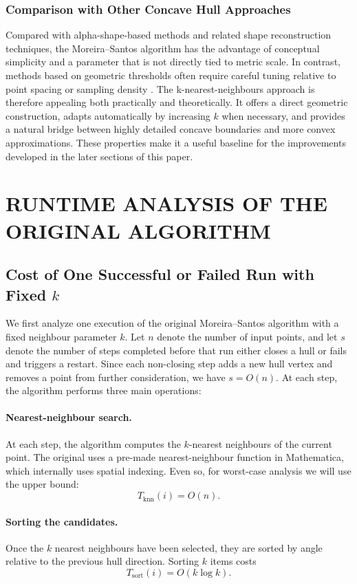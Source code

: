 \documentclass[a4paper,twoside]{article}
\begin{document}
\subsubsection{Comparison with Other Concave Hull Approaches}
Compared with alpha-shape-based methods and related shape reconstruction techniques, the Moreira--Santos algorithm has the advantage of conceptual simplicity and a parameter that is not directly tied to metric scale. In contrast, methods based on geometric thresholds often require careful tuning relative to point spacing or sampling density \cite{edelsbrunner1983,liao2021}.
The k-nearest-neighbours approach is therefore appealing both practically and theoretically. It offers a direct geometric construction, adapts automatically by increasing $k$ when necessary, and provides a natural bridge between highly detailed concave boundaries and more convex approximations. These properties make it a useful baseline for the improvements developed in the later sections of this paper.
\section{\uppercase{Runtime Analysis of the Original Algorithm}}
\subsection{Cost of One Successful or Failed Run with Fixed $k$}
We first analyze one execution of the original Moreira--Santos algorithm with a fixed neighbour parameter $k$. Let $n$ denote the number of input points, and let $s$ denote the number of steps completed before that run either closes a hull or fails and triggers a restart. Since each non-closing step adds a new hull vertex and removes a point from further consideration, we have $s = O(n)$.
At each step, the algorithm performs three main operations:
\paragraph{Nearest-neighbour search.}
At each step, the algorithm computes the $k$-nearest neighbours of the current point. The original uses a pre-made nearest-neighbour function in Mathematica, which internally uses spatial indexing. Even so, for worst-case analysis we will use the upper bound:
\[
T_{\mathrm{knn}}(i)=O(n).
\]
\paragraph{Sorting the candidates.}
Once the $k$ nearest neighbours have been selected, they are sorted by angle relative to the previous hull direction. Sorting $k$ items costs
\[
T_{\mathrm{sort}}(i)=O(k\log k).
\]
\end{document}
